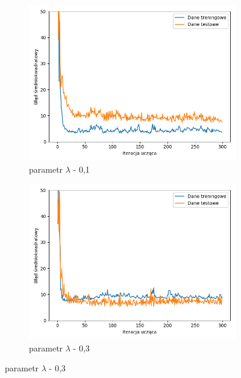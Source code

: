 \documentclass[12pt]{aghdpl}
\begin{document}
		\begin{figure}[h]
		 	\begin{subfigure}{.5\linewidth}
		 		\includegraphics[width =\linewidth]{wykresy/7_badanie_danych/l2/regularyzacja_0_1_wykres_uczenia.png}
		 		\caption{parametr $\lambda$ - 0,1}
		 	\end{subfigure}
		 	\begin{subfigure}{.5\linewidth}
		 		\includegraphics[width =\linewidth]{wykresy/7_badanie_danych/l2/regularyzacja_0_3_wykres_uczenia.png}
		 		\caption{parametr $\lambda$ - 0,3}
		 	\end{subfigure}
		 	

\end{figure}
\end{document}
